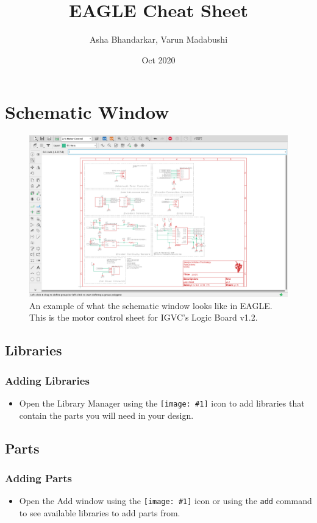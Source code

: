\documentclass{article}
\title{EAGLE Cheat Sheet}
\author{Asha Bhandarkar, Varun Madabushi}
\date{Oct 2020}
\newcommand{\icon}[1]{\texttt{[image: \#1]}}
\begin{document}
\maketitle{}
\setcounter{tocdepth}{3}

\pagebreak

\section{Schematic Window}
\begin{figure}[ht]
	\center
	\includegraphics[width=\textwidth, keepaspectratio]{mainschematic.png}
	\caption{An example of what the schematic window looks like in EAGLE. This is the motor control sheet for IGVC's Logic Board v1.2.}
	\label{fig:schematic window}
\end{figure}


\subsection{Libraries}
\subsubsection{Adding Libraries}
\begin{itemize}
    \item Open the Library Manager using the \icon{libraryman.png} icon to add libraries that contain the parts you will need in your design.
\end{itemize}


\subsection{Parts}
\subsubsection{Adding Parts}
\begin{itemize}
    \item Open the Add window using the \icon{partadd.png} icon or using the \texttt{add} command to see available libraries to add parts from.
\end{itemize}
\end{document}
